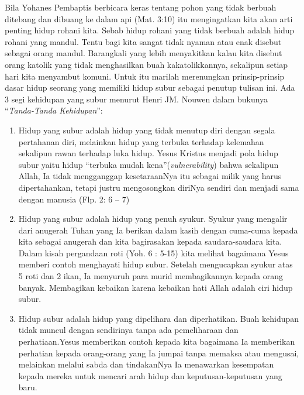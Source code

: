 \small
       Bila Yohanes Pembaptis berbicara keras tentang pohon  yang tidak berbuah ditebang dan dibuang ke dalam api  (Mat. 3:10) itu mengingatkan kita akan arti penting hidup rohani kita. Sebab hidup rohani yang tidak berbuah adalah hidup rohani yang mandul. Tentu bagi kita sangat tidak nyaman atau enak disebut sebagai orang mandul. Barangkali yang lebih menyakitkan kalau kita disebut orang katolik yang tidak menghasilkan buah kakatolikkannya, sekalipun setiap hari kita menyambut komuni. Untuk itu marilah merenungkan prinsip-prinsip dasar hidup seorang yang memiliki hidup subur sebagai penutup tulisan ini. Ada 3 segi kehidupan yang subur  menurut Henri JM. Nouwen dalam bukunya ``\textit{Tanda-Tanda Kehidupan}'':

\begin{enumerate}
\item Hidup yang subur adalah hidup yang tidak menutup diri dengan segala pertahanan diri, melainkan hidup yang terbuka terhadap kelemahan sekalipun rawan terhadap luka hidup. Yesus Kristus menjadi pola hidup subur yaitu hidup ``terbuka mudah kena''(\textit{vulnerability}) bahwa sekalipun Allah, Ia tidak mengganggap kesetaraanNya itu sebagai milik yang harus dipertahankan, tetapi justru mengosongkan diriNya sendiri dan menjadi sama dengan manusia (Flp. 2: 6 – 7)
\item Hidup yang subur adalah hidup yang penuh syukur. Syukur yang mengalir dari anugerah Tuhan yang Ia berikan dalam kasih dengan cuma-cuma kepada kita sebagai anugerah dan kita bagirasakan kepada saudara-saudara kita. Dalam kisah pergandaan roti (Yoh. 6 : 5-15) kita melihat bagaimana Yesus memberi contoh menghayati hidup subur. Setelah mengucapkan syukur atas 5 roti dan 2 ikan, Ia menyuruh para murid membagikannya kepada orang banyak. Membagikan kebaikan karena kebaikan hati Allah adalah ciri hidup subur.
\item Hidup subur adalah hidup yang dipelihara dan diperhatikan. Buah kehidupan tidak  muncul dengan sendirinya tanpa ada pemeliharaan dan perhatiaan.Yesus memberikan  contoh kepada kita bagaimana Ia memberikan perhatian kepada orang-orang yang Ia jumpai tanpa memaksa atau mengusai, melainkan melalui sabda dan tindakanNya Ia menawarkan kesempatan kepada mereka untuk mencari arah hidup dan keputusan-keputusan yang baru.
\end{enumerate}

\normalsize